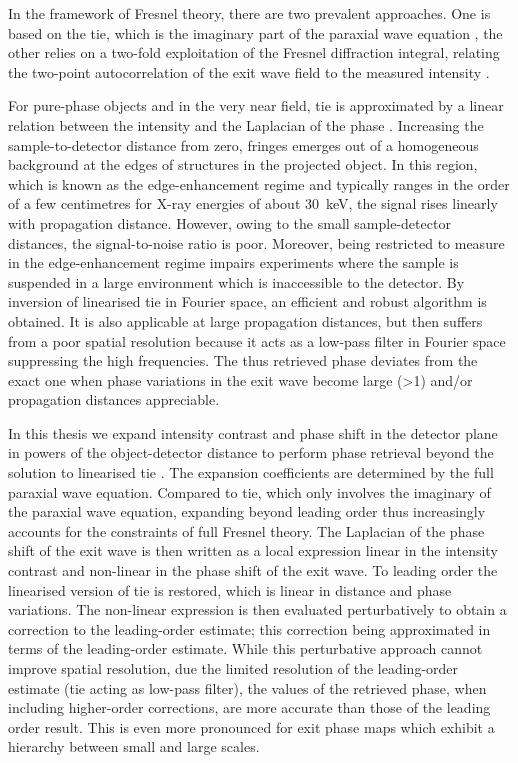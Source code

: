 \documentclass[
twoside,
openright,
titlepage,
numbers=noenddot,
headinclude,
fleqn,
a4paper,
footinclude=true,
cleardoublepage=empty,
abstractoff,
BCOR=5mm,
paper=a4,
fontsize=11pt,
british,ngerman,american,
]{scrreprt}
\begin{document}
In the framework of Fresnel theory, there are two prevalent
approaches.  One is based on the \ac{tie}, which is the imaginary part
of the paraxial wave equation \cite{Teague1982,Rytov1989}, the other
relies on a two-fold exploitation of the Fresnel diffraction integral,
relating the two-point autocorrelation of the exit wave field to the
measured intensity \cite{Guigay1977}.

For pure-phase objects and in the very near field, \ac{tie} is
approximated by a linear relation between the intensity and the
Laplacian of the phase \cite{PaganinBook}.  Increasing the
sample-to-detector distance from zero, fringes emerges out of a
homogeneous background at the edges of structures in the projected
object.  In this region, which is known as the edge-enhancement regime
and typically ranges in the order of a few centimetres for X-ray
energies of about \SI{30}{keV}, the signal rises linearly with
propagation distance.  However, owing to the small sample-detector
distances, the signal-to-noise ratio is poor.  Moreover, being
restricted to measure in the edge-enhancement regime impairs
experiments where the sample is suspended in a large environment which
is inaccessible to the detector.
By inversion of linearised \ac{tie} in Fourier space, an efficient and
robust algorithm is obtained.  It is also applicable at large
propagation distances, but then suffers from a poor spatial resolution
because it acts as a low-pass filter in Fourier space suppressing the
high frequencies.  The thus retrieved phase deviates from the exact
one when phase variations in the exit wave become large (>1) and/or
propagation distances appreciable.  

In this thesis we expand intensity contrast and phase shift in the
detector plane in powers of the object-detector distance to perform
phase retrieval beyond the solution to linearised \ac{tie}
\cite{Moosmann2010opex}.  The expansion coefficients are determined by
the full paraxial wave equation.  Compared to \ac{tie}, which only
involves the imaginary of the paraxial wave equation, expanding beyond
leading order thus increasingly accounts for the constraints of full
Fresnel theory.  The Laplacian of the phase shift of the exit wave is
then written as a local expression linear in the intensity contrast
and non-linear in the phase shift of the exit wave.  To leading order
the linearised version of \ac{tie} is restored, which is linear in
distance and phase variations.  The non-linear expression is then
evaluated perturbatively to obtain a correction to the leading-order
estimate; this correction being approximated in terms of the
leading-order estimate.  While this perturbative approach cannot
improve spatial resolution, due the limited resolution of the
leading-order estimate (\ac{tie} acting as low-pass filter), the
values of the retrieved phase, when including higher-order
corrections, are more accurate than those of the leading order result.
This is even more pronounced for exit phase maps which exhibit a
hierarchy between small and large scales.
\end{document}

